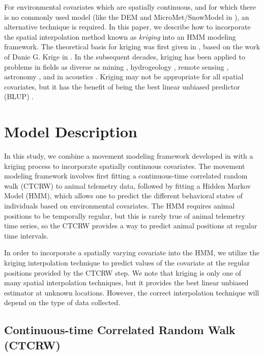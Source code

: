 \documentclass[12pt]{article}
\begin{document}
	For environmental covariates which are spatially continuous, and for which there is no commonly used model (like the DEM and MicroMet/SnowModel in \cite{Beumer2020}), an alternative technique is required. In this paper, we describe how to incorporate the spatial interpolation method known as \emph{kriging} into an HMM modeling framework. The theoretical basis for kriging was first given in \cite{Matheron1963}, based on the work of Danie G. Krige in \cite{Krige1951}. In the subsequent decades, kriging has been applied to problems in fields as diverse as mining \cite{Journel1976}, hydrogeology \cite{Chiles2012}, remote sensing \cite{Papritz1999}, astronomy \cite{Pastorello2014}, and in acoustics \cite{Baume2008, Bostanci2018, Sun2018}. Kriging may not be appropriate for all spatial covariates, but it has the benefit of being the best linear unbiased predictor (BLUP) \cite{Cressie1990}.
	
	\section{Model Description} \label{sec:model_description}
	
	In this study, we combine a movement modeling framework developed in \cite{Johnson2008, McClintock2012, Michelot2016, Whoriskey2017, McClintock2018} with a kriging process to incorporate spatially continuous covariates. The movement modeling framework involves first fitting a continuous-time correlated random walk (CTCRW) to animal telemetry data, followed by fitting a Hidden Markov Model (HMM), which allows one to predict the different behavioral states of individuals based on environmental covariates. The HMM requires animal positions to be temporally regular, but this is rarely true of animal telemetry time series, so the CTCRW provides a way to predict animal positions at regular time intervals.
	
	In order to incorporate a spatially varying covariate into the HMM, we utilize the kriging interpolation technique to predict values of the covariate at the regular positions provided by the CTCRW step. We note that kriging is only one of many spatial interpolation techniques, but it provides the best linear unbiased estimator at unknown locations. However, the correct interpolation technique will depend on the type of data collected.
	
	\subsection{Continuous-time Correlated Random Walk (CTCRW)} \label{sec:ctcrw}
	
\end{document}

